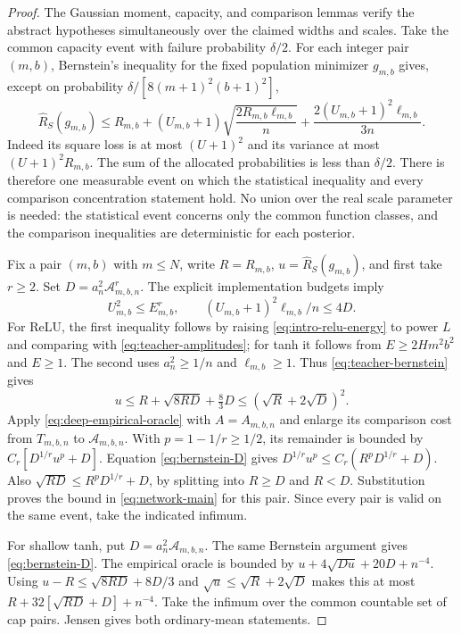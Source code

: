\begin{proof}
The Gaussian moment, capacity, and comparison lemmas verify the abstract hypotheses simultaneously over the claimed widths and scales. Take the common capacity event with failure probability $\delta/2$. For each integer pair $(m,b)$, Bernstein's inequality for the fixed population minimizer $g_{m,b}$ gives, except on probability
$\delta/[8(m+1)^2(b+1)^2]$,
\begin{equation}
 \widehat R_S(g_{m,b})\le R_{m,b}
 +(U_{m,b}+1)\sqrt{\frac{2R_{m,b}\ell_{m,b}}n}
 +\frac{2(U_{m,b}+1)^2\ell_{m,b}}{3n}.
 \label{eq:teacher-bernstein}
\end{equation}
Indeed its square loss is at most $(U+1)^2$ and its variance at most $(U+1)^2R_{m,b}$. The sum of the allocated probabilities is less than $\delta/2$. There is therefore one measurable event on which the statistical inequality and every comparison concentration statement hold. No union over the real scale parameter is needed: the statistical event concerns only the common function classes, and the comparison inequalities are deterministic for each posterior.

Fix a pair $(m,b)$ with $m\le N$, write $R=R_{m,b}$, $u=\widehat R_S(g_{m,b})$, and first take $r\ge2$. Set
$D=a_n^2\mathcal A_{m,b,n}^r$.
The explicit implementation budgets imply
\[
 U_{m,b}^2\le E_{m,b}^r,
 \qquad (U_{m,b}+1)^2\ell_{m,b}/n\le4D.
\]
For ReLU, the first inequality follows by raising \eqref{eq:intro-relu-energy} to power $L$ and comparing with \eqref{eq:teacher-amplitudes}; for tanh it follows from $E\ge2Hm^2b^2$ and $E\ge1$. The second uses $a_n^2\ge1/n$ and $\ell_{m,b}\ge1$. Thus \eqref{eq:teacher-bernstein} gives
\begin{equation}
 u\le R+\sqrt{8RD}+\tfrac83D\le(\sqrt R+2\sqrt D)^2.
 \label{eq:bernstein-D}
\end{equation}
Apply \eqref{eq:deep-empirical-oracle} with $A=A_{m,b,n}$ and enlarge its comparison cost from $T_{m,b,n}$ to $\mathcal A_{m,b,n}$. With $p=1-1/r\ge1/2$, its remainder is bounded by
$C_r[D^{1/r}u^p+D]$.
Equation \eqref{eq:bernstein-D} gives
$D^{1/r}u^p\le C_r(R^pD^{1/r}+D)$.
Also $\sqrt{RD}\le R^pD^{1/r}+D$, by splitting into $R\ge D$ and $R<D$. Substitution proves the bound in \eqref{eq:network-main} for this pair. Since every pair is valid on the same event, take the indicated infimum.

For shallow tanh, put $D=a_n^2\mathcal A_{m,b,n}$. The same Bernstein argument gives \eqref{eq:bernstein-D}. The empirical oracle is bounded by
$u+4\sqrt{Du}+20D+n^{-4}$.
Using $u-R\le\sqrt{8RD}+8D/3$ and $\sqrt u\le\sqrt R+2\sqrt D$ makes this at most
$R+32[\sqrt{RD}+D]+n^{-4}$.
Take the infimum over the common countable set of cap pairs. Jensen gives both ordinary-mean statements.
\end{proof}

